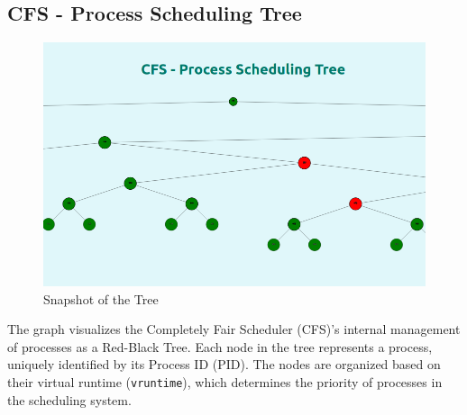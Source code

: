 \documentclass[12pt]{article}
\begin{document}
\subsection{CFS - Process Scheduling Tree}
\begin{figure}[H]
    \centering
    \begin{minipage}{0.8\textwidth}
        \centering
        \includegraphics[width=\textwidth]{logos and images/CFS_1.png}
    \end{minipage}
    \hfill
    
    \caption{Snapshot of the Tree}
\end{figure}
The graph visualizes the Completely Fair Scheduler (CFS)'s internal management of processes as a Red-Black Tree. Each node in the tree represents a process, uniquely identified by its Process ID (PID). The nodes are organized based on their virtual runtime (\texttt{vruntime}), which determines the priority of processes in the scheduling system.
\end{document}
